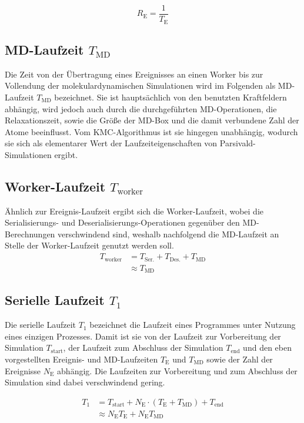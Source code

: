 \begin{equation}
  R_\text{E} = \frac{1}{T_\text{E}}
\end{equation}

\subsection{MD-Laufzeit $T_\text{MD}$}

Die Zeit von der Übertragung eines Ereignisses an einen Worker bis zur Vollendung der molekulardynamischen Simulationen wird im Folgenden als MD-Laufzeit $T_\text{MD}$ bezeichnet.
Sie ist hauptsächlich von den benutzten Kraftfeldern abhängig, wird jedoch auch durch die durchgeführten MD-Operationen, die Relaxationszeit, sowie die Größe der MD-Box und die damit verbundene Zahl der Atome beeinflusst.
Vom KMC-Algorithmus ist sie hingegen unabhängig, wodurch sie sich als elementarer Wert der Laufzeiteigenschaften von Parsivald-Simulationen ergibt.

\subsection{Worker-Laufzeit $T_\text{worker}$}

Ähnlich zur Ereignis-Laufzeit ergibt sich die Worker-Laufzeit, wobei die Serialisierungs- und Deserialisierungs-Operationen gegenüber den MD-Berechnungen verschwindend sind, weshalb nachfolgend die MD-Laufzeit an Stelle der Worker-Laufzeit genutzt werden soll.
\begin{align}
  T_\text{worker} & = T_\text{Ser.} + T_\text{Des.} + T_\text{MD} \\
                  & \approx T_\text{MD}
\end{align}

\subsection{Serielle Laufzeit $T_1$}

Die serielle Laufzeit $T_1$ bezeichnet die Laufzeit eines Programmes unter Nutzung eines einzigen Prozesses.
Damit ist sie von der Laufzeit zur Vorbereitung der Simulation $T_\text{start}$, der Laufzeit zum Abschluss der Simulation $T_\text{end}$ und den eben vorgestellten Ereignis- und MD-Laufzeiten $T_\text{E}$ und $T_\text{MD}$ sowie der Zahl der Ereignisse $N_\text{E}$ abhängig.
Die Laufzeiten zur Vorbereitung und zum Abschluss der Simulation sind dabei verschwindend gering.

\begin{align}
  T_1 & = T_\text{start} + N_\text{E} \cdot (T_\text{E} + T_\text{MD}) + T_\text{end} \\
      & \approx N_\text{E} T_\text{E} + N_\text{E} T_\text{MD}
\end{align}

